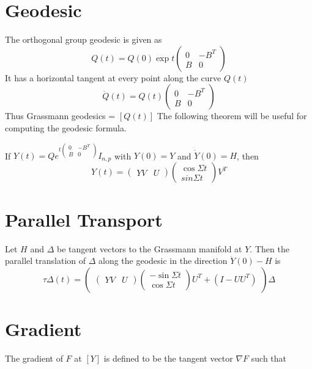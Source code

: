 \documentclass[11pt,a4paper]{report}
\begin{document}
\section{Geodesic}
The orthogonal group geodesic is given as
$$Q(t) = Q(0) \exp t \begin{pmatrix} 0 & -B^T \\ B & 0 \end{pmatrix} $$
It has a horizontal tangent at every point along the curve $Q(t)$
$$ \dot{Q}(t) = Q(t) \begin{pmatrix} 0 & -B^T \\ B & 0 \end{pmatrix}$$
Thus Grassmann geodesics = $ [ Q(t) ] $
The following theorem will be useful for computing the geodesic formula.
\begin{thm}
    If $Y(t) = Q e^{t \begin{pmatrix} 0 & -B^T \\ B & 0 \end{pmatrix} } I_{n,p} $ with $Y(0) = Y$ and $\dot{Y}(0) = H$, then
    $$ Y(t) = \begin{pmatrix} YV & U \end{pmatrix} \begin{pmatrix} \cos \Sigma t \\ sin \Sigma t \end{pmatrix} V^T $$
\end{thm}

\section{Parallel Transport}
\begin{thm}
    Let $H$ and $\Delta$ be tangent vectors to the Grassmann manifold at $Y$.
    Then the parallel translation of $\Delta$ along the geodesic in the direction $\dot{Y}(0) - H$ is
    $$ \tau \Delta(t) = \begin{pmatrix} \begin{pmatrix} YV & U \end{pmatrix} \begin{pmatrix} -\sin \Sigma t \\ \cos \Sigma t \end{pmatrix} U^T + (I - UU^T) \end{pmatrix} \Delta $$
\end{thm}
\section{Gradient}
The gradient of $F$ at $[Y]$ is defined to be the tangent vector $\nabla F$ such that
\end{document}
